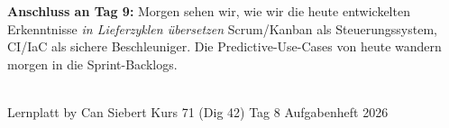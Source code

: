 \documentclass[11pt,a4paper,oneside]{article}
\begin{document}
\medskip
\noindent\textbf{Anschluss an Tag 9:} Morgen sehen wir, wie wir die heute entwickelten Erkenntnisse \emph{in Lieferzyklen \"ubersetzen} \textendash{} Scrum/Kanban als Steuerungssystem, CI/IaC als sichere Beschleuniger. Die Predictive-Use-Cases von heute wandern morgen in die Sprint-Backlogs.

\vspace{1cm}
\noindent{\color{lpAccent}\rule{\linewidth}{0.6pt}}\\[4pt]
{\footnotesize\sffamily\color{lpGray}Lernplatt \textperiodcentered{} by Can Siebert \textperiodcentered{} Kurs 71 (Dig 42) \textperiodcentered{} Tag 8 \textperiodcentered{} Aufgabenheft \textperiodcentered{} \textcopyright{} 2026}
\end{document}
